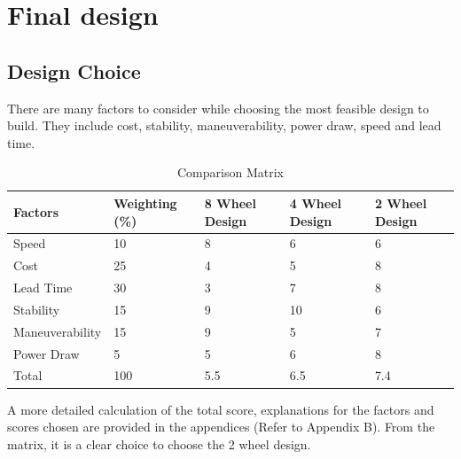 \documentclass[12pt]{report}
\begin{document}

\chapter{Final design}
\section{Design Choice}

There are many factors to consider while choosing the most feasible design to build. They include cost, stability, maneuverability, power draw, speed and lead time.


\begin{table}[htbp]
\centering
\begin{tabular}{|l|l|l|l|l|}\hline
Factors         & Weighting (\%) & 8 Wheel Design & 4 Wheel Design & 2 Wheel Design \\ \hline
Speed           & 10             & 8              & 6              & 6              \\ \hline
Cost            & 25             & 4              & 5              & 8              \\ \hline
Lead Time       & 30             & 3              & 7              & 8              \\ \hline
Stability       & 15             & 9              & 10             & 6              \\ \hline
Maneuverability & 15             & 9              & 5              & 7              \\ \hline
Power Draw      & 5              & 5              & 6              & 8              \\ \hline
Total           & 100            & 5.5            & 6.5            & 7.4           \\ \hline
\end{tabular}
\caption{Comparison Matrix}
\end{table}

A more detailed calculation of the total score, explanations for the factors and scores chosen are provided in the appendices (Refer to Appendix B). From the matrix, it is a clear choice to choose the 2 wheel design.
\end{document}
